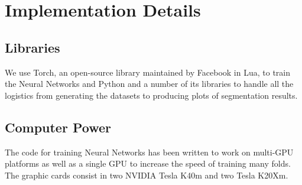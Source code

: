 \section{Implementation Details}

\subsection{Libraries}

We use Torch, an open-source library maintained by Facebook in Lua, to train the Neural Networks and Python and a number of its libraries to handle all the logistics from generating the datasets to producing plots of segmentation results.

\subsection{Computer Power}

The code for training Neural Networks has been written to work on multi-GPU platforms as well as a single GPU to increase the speed of training many folds. The graphic cards consist in two NVIDIA Tesla K40m and two Tesla K20Xm.


